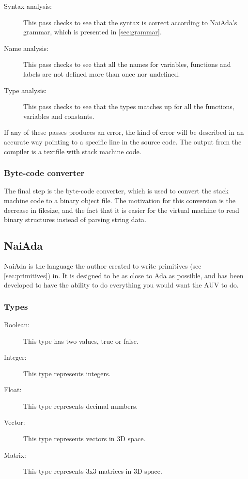 \begin{description}
\item[Syntax analysis:] This pass checks to see that the syntax is correct according to NaiAda's grammar, which is presented in \cref{sec:grammar}.
\item[Name analysis:] This pass checks to see that all the names for variables, functions and labels are not defined more than once nor undefined.
\item[Type analysis:] This pass checks to see that the types matches up for all the functions, variables and constants.
\end{description}

If any of these passes produces an error, the kind of error will be described in an accurate way pointing to a specific line in the source code. The output from the compiler is a textfile with stack machine code.

\subsubsection{Byte-code converter}
The final step is the byte-code converter, which is used to convert the stack machine code to a binary object file. The motivation for this conversion is the decrease in filesize, and the fact that it is easier for the virtual machine to read binary structures instead of parsing string data.


\subsection{NaiAda}
\label{sec:naiada}
NaiAda is the language the author created to write primitives (see \cref{sec:primitives}) in. It is designed to be as close to Ada as possible, and has been developed to have the ability to do everything you would want the AUV to do.
\subsubsection{Types}
\begin{description}
\item[Boolean:] This type has two values, true or false.
\item[Integer:] This type represents integers.
\item[Float:] This type represents decimal numbers.
\item[Vector:] This type represents vectors in 3D space.
\item[Matrix:] This type represents 3x3 matrices in 3D space.
\end{description}

